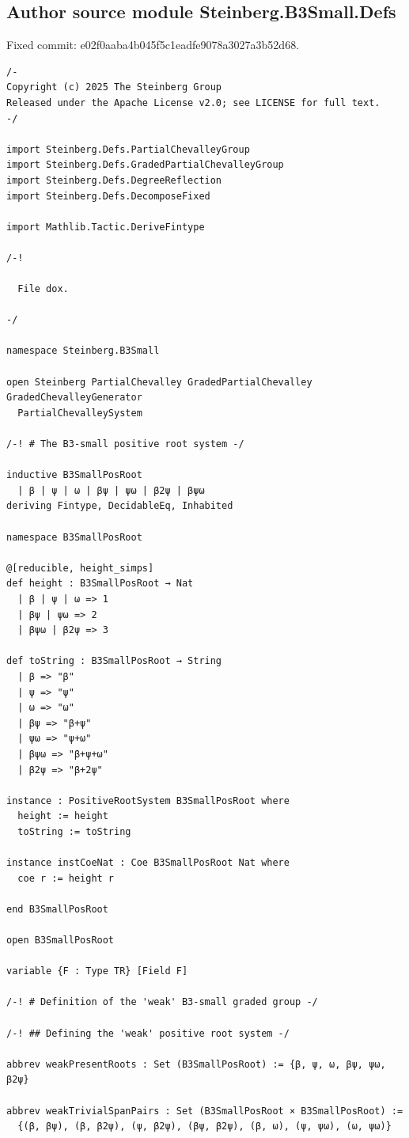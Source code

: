 \subsection*{Author source module Steinberg.B3Small.Defs}
\noindent Fixed commit: e02f0aaba4b045f5c1eadfe9078a3027a3b52d68.
\begin{Verbatim}
/-
Copyright (c) 2025 The Steinberg Group
Released under the Apache License v2.0; see LICENSE for full text.
-/

import Steinberg.Defs.PartialChevalleyGroup
import Steinberg.Defs.GradedPartialChevalleyGroup
import Steinberg.Defs.DegreeReflection
import Steinberg.Defs.DecomposeFixed

import Mathlib.Tactic.DeriveFintype

/-!

  File dox.

-/

namespace Steinberg.B3Small

open Steinberg PartialChevalley GradedPartialChevalley GradedChevalleyGenerator
  PartialChevalleySystem

/-! # The B3-small positive root system -/

inductive B3SmallPosRoot
  | β | ψ | ω | βψ | ψω | β2ψ | βψω
deriving Fintype, DecidableEq, Inhabited

namespace B3SmallPosRoot

@[reducible, height_simps]
def height : B3SmallPosRoot → Nat
  | β | ψ | ω => 1
  | βψ | ψω => 2
  | βψω | β2ψ => 3

def toString : B3SmallPosRoot → String
  | β => "β"
  | ψ => "ψ"
  | ω => "ω"
  | βψ => "β+ψ"
  | ψω => "ψ+ω"
  | βψω => "β+ψ+ω"
  | β2ψ => "β+2ψ"

instance : PositiveRootSystem B3SmallPosRoot where
  height := height
  toString := toString

instance instCoeNat : Coe B3SmallPosRoot Nat where
  coe r := height r

end B3SmallPosRoot

open B3SmallPosRoot

variable {F : Type TR} [Field F]

/-! # Definition of the 'weak' B3-small graded group -/

/-! ## Defining the 'weak' positive root system -/

abbrev weakPresentRoots : Set (B3SmallPosRoot) := {β, ψ, ω, βψ, ψω, β2ψ}

abbrev weakTrivialSpanPairs : Set (B3SmallPosRoot × B3SmallPosRoot) :=
  {(β, βψ), (β, β2ψ), (ψ, β2ψ), (βψ, β2ψ), (β, ω), (ψ, ψω), (ω, ψω)}


\end{Verbatim}
